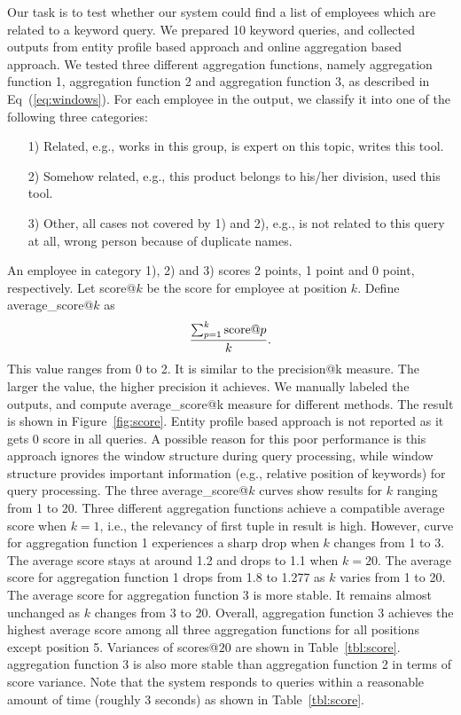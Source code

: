 \documentclass{sig-alternate}
\theoremstyle{definition}
\begin{document}
Our task is to test whether our system could find a list of employees which are related to a keyword query. We prepared 10 keyword queries, and collected outputs from entity profile based approach and online aggregation based approach. We tested three different aggregation functions, namely aggregation function 1, aggregation function 2 and aggregation function 3, as described in Eq~(\ref{eq:windows}). For each employee in the output, we classify it into one of the following three categories:
\begin{itemize}
\item[1)] Related, e.g., works in this group, is expert on this topic, writes this tool.
\item[2)] Somehow related, e.g., this product belongs to his/her division, used this tool.
\item[3)] Other, all cases not covered by 1) and 2), e.g., is not related to this query at all, wrong person because of duplicate names.
\end{itemize}
An employee in category 1), 2) and 3) scores 2 points, 1 point and 0 point, respectively. Let score@$k$ be the score for employee at position $k$. Define average\_score@$k$ as \[ {\sum_{p = 1}^k \mbox{score@}p \over k}.\] This value ranges from 0 to 2. It is similar to the precision@k measure. The larger the value, the higher precision it achieves. We manually labeled the outputs, and compute average\_score@k measure for different methods. The result is shown in Figure~\ref{fig:score}. Entity profile based approach is not reported as it gets 0 score in all queries. A possible reason for this poor performance is this approach ignores the window structure during query processing, while window structure provides important information (e.g., relative position of keywords) for query processing. The three average\_score@$k$ curves show results for $k$ ranging from 1 to 20. Three different aggregation functions achieve a compatible average score when $k = 1$, i.e., the relevancy of first tuple in result is high. However, curve for aggregation function 1 experiences a sharp drop when $k$ changes from 1 to 3. The average score stays at around 1.2 and drops to 1.1 when $k = 20$. The average score for aggregation function 1 drops from 1.8 to 1.277 as $k$ varies from 1 to 20. The average score for aggregation function 3 is more stable. It remains almost unchanged as $k$ changes from 3 to 20. Overall, aggregation function 3 achieves the highest average score among all three aggregation functions for all positions except position 5. Variances of scores@$20$ are shown in Table~\ref{tbl:score}. aggregation function 3 is also more stable than aggregation function 2 in terms of score variance. Note that the system responds to queries within a reasonable amount of time (roughly 3 seconds) as shown in Table~\ref{tbl:score}.
\end{document}
